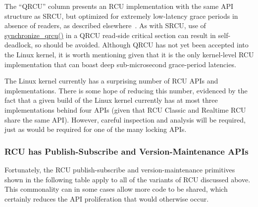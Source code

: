 The ``QRCU'' column presents an RCU implementation with the same
API structure as SRCU, but optimized for extremely low-latency
grace periods in absence of readers, as described
elsewhere~\cite{PaulEMcKenney2007QRCUspin}.
As with SRCU, use of \url{synchronize_qrcu()} in a QRCU read-side
critical section can result in
self-deadlock, so should be avoided.
Although QRCU has not yet been accepted into the Linux kernel, it
is worth mentioning given that it is the only kernel-level
RCU implementation
that can boast deep sub-microsecond grace-period latencies.

 \QuickQuizEnd

The Linux kernel currently has a surprising number of RCU APIs and
implementations.
There is some hope of reducing this number, evidenced by the fact
that a given build of the Linux kernel currently has at most
three implementations behind four APIs (given that RCU Classic
and Realtime RCU share the same API).
However, careful inspection and analysis will be required, just as
would be required for one of the many locking APIs.

\subsubsection{RCU has Publish-Subscribe and Version-Maintenance APIs}
\label{sec:defer:RCU has Publish-Subscribe and Version-Maintenance APIs}

Fortunately, the RCU publish-subscribe and version-maintenance
primitives shown in the following
table apply to all of the variants of RCU discussed above.
This commonality can in some cases allow more code to be shared,
which certainly reduces the API proliferation that would otherwise
occur.

